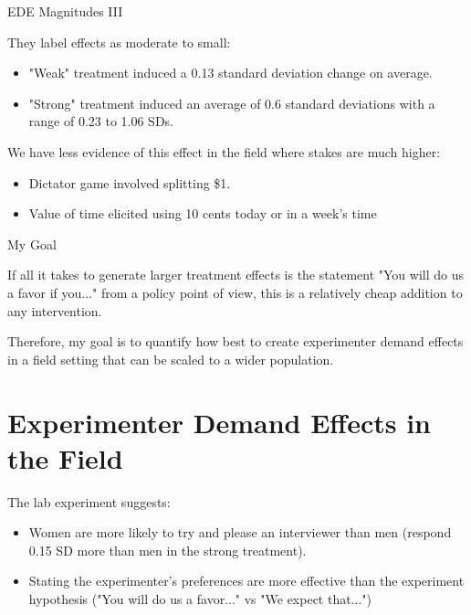 \documentclass[aspectratio=169,xcolor=dvipsnames]{beamer}
\begin{document}
\begin{frame}{EDE Magnitudes III}

    They label effects as moderate to small:
    
    \begin{itemize}
        \item  "Weak" treatment induced a 0.13 standard deviation change on average.
        \item "Strong" treatment induced an average of 0.6 standard deviations with a 
        range of 0.23 to 1.06 SDs.
    \end{itemize}



    We have less evidence of this effect in the field where stakes are much 
    higher:

    \begin{itemize}
        \item Dictator game involved splitting \$1.
        \item Value of time elicited using 10 cents today or in a week's time
    \end{itemize}
\end{frame}


\begin{frame}{My Goal}

    If all it takes to generate larger treatment effects is the 
    statement "You will do us a favor if you..." from a policy point of view, this is a relatively cheap addition to any 
    intervention.

    \vfill
    Therefore, my goal is to quantify how best to create experimenter demand effects in a field 
    setting that can be scaled to a wider population. 

\end{frame}

\section{Experimenter Demand Effects in the Field}



\begin{frame}{}

    The lab experiment suggests:
    \begin{itemize}
            \item Women are more likely to try and please an interviewer than men (respond 0.15 SD 
            more than men in the strong treatment).
            \item Stating the experimenter's preferences are more effective than the 
            experiment hypothesis ("You will do us a favor..." vs "We expect that...")
    \end{itemize}

\end{frame}
\end{document}
